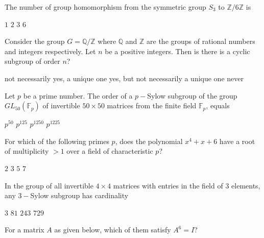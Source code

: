 \documentclass[10pt]{exam}
\begin{document}
\begin{questions}
\question
The number of group homomorphism from the symmetric group $S_3$ to $\mathbb{Z}/6 \mathbb{Z}$ is 

\begin{oneparchoices}
\choice $1$
\choice $2$
\choice $3$
\choice $6$  
\end{oneparchoices}

\question
Consider the group $G=\mathbb{Q}/\mathbb{Z}$ where $\mathbb{Q}$ and $\mathbb{Z}$ are the groups of rational numbers and integers respectively. Let $n$ be a positive integers. Then is there is a cyclic subgroup of order $n$?

\begin{choices}
\choice not necessarily 
\choice yes, a unique one
\choice yes, but not necessarily a unique one
\choice never
\end{choices}

\question
Let $p$ be a prime number. The order of a $p-$Sylow subgroup of the group $GL_{50}(\mathbb{F}_p)$ of invertible $50 \times 50$ matrices from the finite field $\mathbb{F}_p$, equals

\begin{oneparchoices}
\choice $p^{50}$
\choice $p^{125}$
\choice $p^{1250}$
\choice $p^{1225}$  
\end{oneparchoices}

\question
For which of the following primes $p$, does the polynomial $x^4+x+6$ have a root of multiplicity $>1$ over a field of characteristic $p$?

\begin{oneparchoices}
\choice $2$
\choice $3$
\choice $5$
\choice $7$  
\end{oneparchoices}


\question
In the group of all invertible $4 \times 4$ matrices with entries in the field of $3$ elements, any $3-$Sylow subgroup has cardinality

\begin{oneparchoices}
\choice $3$
\choice $81$
\choice $243$
\choice $729$
\end{oneparchoices}


\question 
For a matrix $A$ as given below, which of them satisfy $A^6 = I$?


\end{questions}
\end{document}
